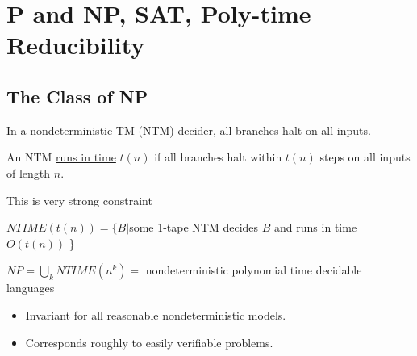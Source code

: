 \chapter{P and NP, SAT, Poly-time Reducibility}

\section{The Class of NP}

In a nondeterministic TM (NTM) decider, all branches halt on all inputs.
\begin{definition}
    An NTM \underline{runs in time} \(t(n)\) if all branches halt within \(t(n)\) steps on all inputs of length \(n\).  
    \begin{intuition}
        This is very strong constraint
    \end{intuition}
\end{definition}

\begin{definition}
    \(NTIME(t(n)) = \{ B | \)some 1-tape NTM decides \(B\) and runs in time \(O(t(n))\)  \}  

\end{definition}


\begin{definition}
    \(NP = \bigcup_k NTIME(n^k) = \) nondeterministic polynomial time decidable languages 
\end{definition}

\begin{itemize}
    \item Invariant for all reasonable nondeterministic models.
    \item Corresponds roughly to easily verifiable problems.
\end{itemize}

